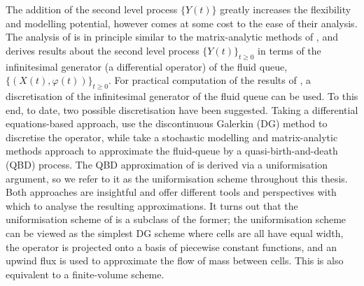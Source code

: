 The addition of the second level process \(\{Y(t)\}\) greatly increases the flexibility and modelling potential, however comes at some cost to the ease of their analysis. The analysis of \cite{bo2014} is in principle similar to the matrix-analytic methods of \cite{bean2005}, and derives results about the second level process \(\{Y(t)\}_{t\geq0}\) in terms of the infinitesimal generator (a differential operator) of the fluid queue, \(\{(X(t),\varphi(t))\}_{t\geq0}\). For practical computation of the results of \cite{bo2014}, a discretisation of the infinitesimal generator of the fluid queue can be used. To this end, to date, two possible discretisation have been suggested. Taking a differential equations-based approach, \cite{blnos2022} use the discontinuous Galerkin (DG) method to discretise the operator, while \cite{bo2013} take a stochastic modelling and matrix-analytic methods approach to approximate the fluid-queue by a quasi-birth-and-death (QBD) process. The QBD approximation of \cite{bo2013} is derived via a uniformisation argument, so we refer to it as the uniformisation scheme throughout this thesis. Both approaches are insightful and offer different tools and perspectives with which to analyse the resulting approximations. It turns out that the uniformisation scheme of \cite{bo2013} is a subclass of the former; the uniformisation scheme can be viewed as the simplest DG scheme where cells are all have equal width, the operator is projected onto a basis of piecewise constant functions, and an upwind flux is used to approximate the flow of mass between cells. This is also equivalent to a finite-volume scheme.


